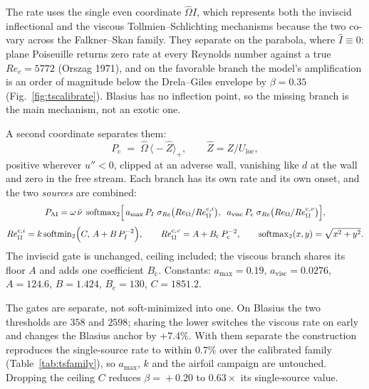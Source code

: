 
The rate uses the single even coordinate $\hat\Omega\hat I$, which represents
both the inviscid inflectional and the viscous Tollmien--Schlichting mechanisms
because the two co-vary across the Falkner--Skan family. They separate on
the parabola, where $\hat I\equiv0$: plane Poiseuille returns zero rate at
every Reynolds number against a true $Re_c=5772$ (Orszag 1971), and on the
favorable branch the model's amplification is an order of magnitude below
the Drela--Giles envelope by $\beta\!=\!0.35$ (Fig.~\ref{fig:tscalibrate}).
Blasius has no inflection point, so the missing branch is the main mechanism,
not an exotic one.

A second coordinate separates them:
\begin{equation}
  P_{\mathrm{c}} \;=\; \hat\Omega\,\big\langle -\hat Z\big\rangle_+,
  \qquad \hat Z = Z/U_\mathrm{loc},
  \label{eq:ts_pcurv}
\end{equation}
positive wherever $u''<0$, clipped at an adverse wall, vanishing like $d$ at
the wall and zero in the free stream. Each branch has its own rate and its own onset, and the two \emph{sources} are combined:
\begin{gather}
  P_{\mathrm{AI}} = \omega\,\tilde\nu\;
  \operatorname{softmax}_2\!\Big[\,
     a_{\max}\,P_I\;\sigma_{Re}\big(Re_\Omega/Re_\Omega^{\mathrm c,i}\big),\;\;
     a_{\mathrm{visc}}\,P_{\mathrm{c}}\;\sigma_{Re}\big(Re_\Omega/Re_\Omega^{\mathrm c,v}\big)
  \Big],
  \label{eq:ts_twosource}\\[3pt]
  Re_\Omega^{\mathrm c,i} = k\operatorname{softmin}_2\!\Big(C,\,A+B\,P_I^{-2}\Big),
  \qquad
  Re_\Omega^{\mathrm c,v} = A + B_{\mathrm c}\,P_{\mathrm{c}}^{-2},
  \qquad
  \operatorname{softmax}_2(x,y)=\sqrt{x^2+y^2}.
  \notag
\end{gather}
The inviscid gate is unchanged, ceiling included; the viscous branch shares
its floor $A$ and adds one coefficient $B_{\mathrm c}$. Constants:
$a_{\max}\!=\!0.19$, $a_{\mathrm{visc}}\!=\!0.0276$, $A\!=\!124.6$,
$B\!=\!1.424$, $B_{\mathrm c}\!=\!130$, $C\!=\!1851.2$.

The gates are separate, not soft-minimized into one. On Blasius the two
thresholds are $358$ and $2598$; sharing the lower switches the viscous rate
on early and changes the Blasius anchor by $+7.4\%$. With them separate the
construction reproduces the single-source rate to within $0.7\%$ over the
calibrated family (Table~\ref{tab:tsfamily}), so $a_{\max}$, $k$ and the
airfoil campaign are untouched. Dropping the ceiling $C$ reduces $\beta\!=\!+0.20$ to $0.63\times$ its single-source value.

